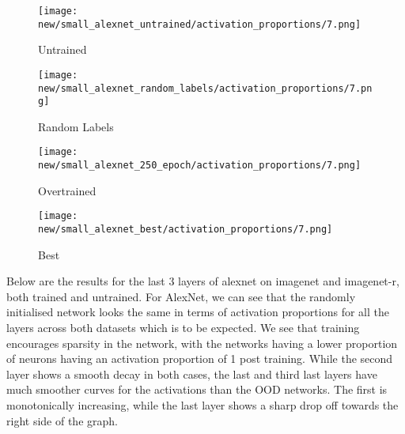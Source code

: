 \documentclass{article}
\begin{document}
            \begin{figure}[H]
                \centering
                \begin{minipage}{0.45\textwidth}
                    \centering
                    \texttt{[image: new/small\_alexnet\_untrained/activation\_proportions/7.png]}
                    \caption{Untrained}
                \end{minipage}
                \hfill
                \begin{minipage}{0.45\textwidth}
                    \centering
                    \texttt{[image: new/small\_alexnet\_random\_labels/activation\_proportions/7.png]}
                    \caption{Random Labels}
                \end{minipage}
                \begin{minipage}{0.45\textwidth}
                    \centering
                    \texttt{[image: new/small\_alexnet\_250\_epoch/activation\_proportions/7.png]}
                    \caption{Overtrained}
                \end{minipage}
                \hfill
                \begin{minipage}{0.45\textwidth}
                    \centering
                    \texttt{[image: new/small\_alexnet\_best/activation\_proportions/7.png]}
                    \caption{Best}
                \end{minipage}
                \hfill
                
                \label{fig:class_frog}
            \end{figure}
            Below are the results for the last 3 layers of alexnet on imagenet and imagenet-r, both trained and untrained. For AlexNet, we can see that the randomly initialised network looks the same in terms of activation proportions for all the layers across both datasets which is to be expected. We see that training encourages sparsity in the network, with the networks having a lower proportion of neurons having an activation proportion of 1 post training. While the second layer shows a smooth decay in both cases, the last and third last layers have much smoother curves for the activations than the OOD networks. The first is monotonically increasing, while the last layer shows a sharp drop off towards the right side of the graph.
\end{document}
